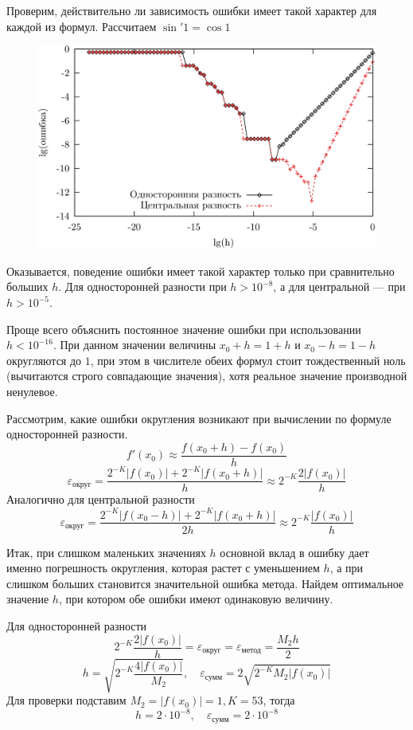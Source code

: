 \documentclass[professionalfonts,compress,unicode]{beamer}
\begin{document}
{
	Проверим, действительно ли зависимость ошибки имеет такой характер для каждой из формул. Рассчитаем $\sin'1 = \cos 1$
	
	\begin{figure}%
	\includegraphics[height=0.5\textheight]{diff}%
	\end{figure}
	
	Оказывается, поведение ошибки имеет такой характер только при сравнительно больших $h$. Для односторонней разности при $h > 10^{-8}$,
	а для центральной --- при $h > 10^{-5}$. 
}

{
	Проще всего объяснить постоянное значение ошибки при использовании $h < 10^{-16}$. При данном значении величины 
	$x_0+h = 1+h$ и $x_0-h = 1-h$ округляются до $1$, при этом в числителе обеих формул стоит тождественный ноль 
	(вычитаются строго совпадающие значения), хотя реальное значение производной ненулевое.
	\pause
		
	Рассмотрим, какие ошибки округления возникают при вычислении по формуле односторонней разности. 
	$$
	f'(x_0) \approx \frac{f(x_0+h)-f(x_0)}{h}
	$$
	$$
	\varepsilon_{\text{округ}} = \frac{2^{-K}|f(x_0)|+2^{-K}|f(x_0+h)|}{h} \approx 2^{-K} \frac{2|f(x_0)|}{h}
	$$
	Аналогично для центральной разности
	$$
	\varepsilon_{\text{округ}} = \frac{2^{-K}|f(x_0-h)|+2^{-K}|f(x_0+h)|}{2h} \approx 2^{-K} \frac{|f(x_0)|}{h}
	$$
}

{
	Итак, при слишком маленьких значениях $h$ основной вклад в ошибку дает именно погрешность округления, которая
	растет с уменьшением $h$, а при слишком больших становится значительной ошибка метода. Найдем оптимальное значение
	$h$, при котором обе ошибки имеют одинаковую величину.
	\pause
	
	Для односторонней разности
	$$
	2^{-K} \frac{2|f(x_0)|}{h} = \varepsilon_{\text{округ}} = \varepsilon_{\text{метод}} = \frac{M_2 h}{2}
	$$
	$$
	h = \sqrt{2^{-K}\frac{4|f(x_0)|}{M_2}},\quad \varepsilon_{\text{сумм}} = 2 \sqrt{2^{-K} M_2 |f(x_0)|}
	$$
	Для проверки подставим $M_2 = |f(x_0)| = 1, K=53$, тогда
	$$h=2 \cdot 10^{-8},  \quad \varepsilon_{\text{сумм}} = 2 \cdot 10^{-8}$$
}
\end{document}
